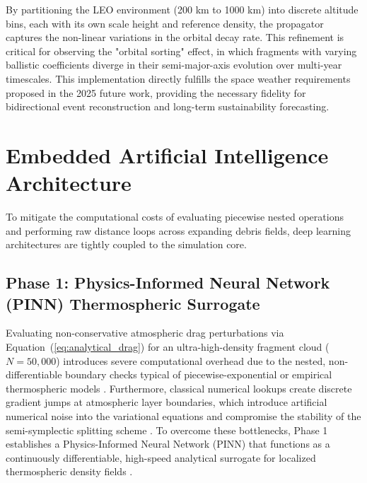 \documentclass[letterpaper,11pt]{AAS}
\begin{document}
By partitioning the LEO environment (200 km to 1000 km) into discrete altitude bins, each with its own scale height and reference density, the propagator captures the non-linear variations in the orbital decay rate. This refinement is critical for observing the "orbital sorting" effect, in which fragments with varying ballistic coefficients diverge in their semi-major-axis evolution over multi-year timescales. This implementation directly fulfills the space weather requirements proposed in the 2025 future work, providing the necessary fidelity for bidirectional event reconstruction and long-term sustainability forecasting.

\section{Embedded Artificial Intelligence Architecture}
\label{sec:ai_architecture}

To mitigate the computational costs of evaluating piecewise nested operations and performing raw distance loops across expanding debris fields, deep learning architectures are tightly coupled to the simulation core.

\subsection{Phase 1: Physics-Informed Neural Network (PINN) Thermospheric Surrogate}
\label{subsec:pinn_surrogate}

Evaluating non-conservative atmospheric drag perturbations via Equation~(\ref{eq:analytical_drag}) for an ultra-high-density fragment cloud ($N = 50,000$) introduces severe computational overhead due to the nested, non-differentiable boundary checks typical of piecewise-exponential or empirical thermospheric models \cite{puerta-ibarra_advanced_2025, target_paper_2026}. Furthermore, classical numerical lookups create discrete gradient jumps at atmospheric layer boundaries, which introduce artificial numerical noise into the variational equations and compromise the stability of the semi-symplectic splitting scheme \cite{target_paper_2026}. To overcome these bottlenecks, Phase 1 establishes a Physics-Informed Neural Network (PINN) that functions as a continuously differentiable, high-speed analytical surrogate for localized thermospheric density fields \cite{target_paper_2026}.
\end{document}
